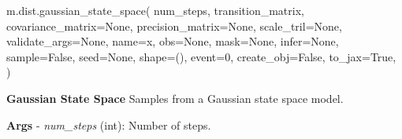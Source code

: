 \documentclass[
  letterpaper,
  DIV=11,
  numbers=noendperiod]{scrartcl}
\newenvironment{Shaded}{\begin{snugshade}}{\end{snugshade}}
\newcommand{\DecValTok}[1]{\textcolor[rgb]{0.68,0.00,0.00}{#1}}
\newcommand{\NormalTok}[1]{\textcolor[rgb]{0.00,0.23,0.31}{#1}}
\newcommand{\OperatorTok}[1]{\textcolor[rgb]{0.37,0.37,0.37}{#1}}
\newcommand{\StringTok}[1]{\textcolor[rgb]{0.13,0.47,0.30}{#1}}
\newcommand{\VariableTok}[1]{\textcolor[rgb]{0.07,0.07,0.07}{#1}}
\begin{document}
\begin{Shaded}
\begin{Highlighting}[]
\NormalTok{m.dist.gaussian\_state\_space(}
\NormalTok{    num\_steps,}
\NormalTok{    transition\_matrix,}
\NormalTok{    covariance\_matrix}\OperatorTok{=}\VariableTok{None}\NormalTok{,}
\NormalTok{    precision\_matrix}\OperatorTok{=}\VariableTok{None}\NormalTok{,}
\NormalTok{    scale\_tril}\OperatorTok{=}\VariableTok{None}\NormalTok{,}
\NormalTok{    validate\_args}\OperatorTok{=}\VariableTok{None}\NormalTok{,}
\NormalTok{    name}\OperatorTok{=}\StringTok{\textquotesingle{}x\textquotesingle{}}\NormalTok{,}
\NormalTok{    obs}\OperatorTok{=}\VariableTok{None}\NormalTok{,}
\NormalTok{    mask}\OperatorTok{=}\VariableTok{None}\NormalTok{,}
\NormalTok{    infer}\OperatorTok{=}\VariableTok{None}\NormalTok{,}
\NormalTok{    sample}\OperatorTok{=}\VariableTok{False}\NormalTok{,}
\NormalTok{    seed}\OperatorTok{=}\VariableTok{None}\NormalTok{,}
\NormalTok{    shape}\OperatorTok{=}\NormalTok{(),}
\NormalTok{    event}\OperatorTok{=}\DecValTok{0}\NormalTok{,}
\NormalTok{    create\_obj}\OperatorTok{=}\VariableTok{False}\NormalTok{,}
\NormalTok{    to\_jax}\OperatorTok{=}\VariableTok{True}\NormalTok{,}
\NormalTok{)}
\end{Highlighting}
\end{Shaded}

\textbf{Gaussian State Space} Samples from a Gaussian state space model.

\textbf{Args} - \emph{num\_steps} (int): Number of steps.
\end{document}
